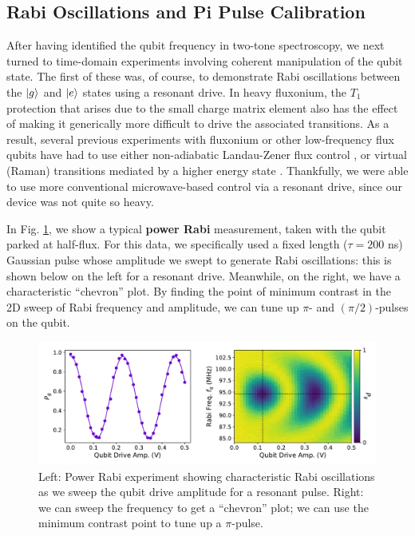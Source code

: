 \subsection{Rabi Oscillations and Pi Pulse Calibration}

After having identified the qubit frequency in two-tone spectroscopy, we next turned to time-domain experiments involving coherent manipulation of the qubit state. The first of these was, of course, to demonstrate Rabi oscillations between the $\lvert g\rangle$ and $\lvert e\rangle$ states using a resonant drive. In heavy fluxonium, the $T_1$ protection that arises due to the small charge matrix element also has the effect of making it generically more difficult to drive the associated transitions. As a result, several previous experiments with fluxonium or other low-frequency flux qubits have had to use either non-adiabatic Landau-Zener flux control \cite{oliver2005mach, campbell2020universal, zhang2021universal}, or virtual (Raman) transitions mediated by a higher energy state \cite{earnest2018realization}. Thankfully, we were able to use more conventional microwave-based control via a resonant drive, since our device was not quite so heavy. 

In Fig. \ref{fig:4_rabi}, we show a typical \textbf{power Rabi} measurement, taken with the qubit parked at half-flux. For this data, we specifically used a fixed length ($\tau = 200$ ns) Gaussian pulse whose amplitude we swept to generate Rabi oscillations: this is shown below on the left for a resonant drive. Meanwhile, on the right, we have a characteristic ``chevron'' plot. By finding the point of minimum contrast in the 2D sweep of Rabi frequency and amplitude, we can tune up $\pi$- and $(\pi/2)$-pulses on the qubit. 

\begin{figure}[h]
    \centering
    \includegraphics[width=0.95\linewidth]{Figures/4/rabi.pdf}
    \caption{Left: Power Rabi experiment showing characteristic Rabi oscillations as we sweep the qubit drive amplitude for a resonant pulse. Right: we can sweep the frequency to get a ``chevron'' plot; we can use the minimum contrast point to tune up a $\pi$-pulse.}
    \label{fig:4_rabi}
\end{figure}

